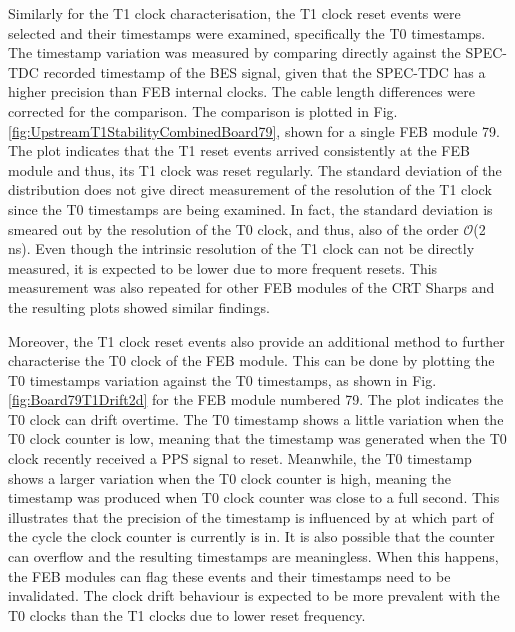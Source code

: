 Similarly for the T1 clock characterisation, the T1 clock reset events were selected and their timestamps were examined, specifically the T0 timestamps.
The timestamp variation was measured by comparing directly against the SPEC-TDC recorded timestamp of the BES signal, given that the SPEC-TDC has a higher precision than FEB internal clocks.
The cable length differences were corrected for the comparison.
The comparison is plotted in Fig. \ref{fig:UpstreamT1StabilityCombinedBoard79}, shown for a single FEB module 79.
The plot indicates that the T1 reset events arrived consistently at the FEB module and thus, its T1 clock was reset regularly.
The standard deviation of the distribution does not give direct measurement of the resolution of the T1 clock since the T0 timestamps are being examined. 
In fact, the standard deviation is smeared out by the resolution of the T0 clock, and thus, also of the order $\mathcal{O}$(2 ns).
Even though the intrinsic resolution of the T1 clock can not be directly measured, it is expected to be lower due to more frequent resets.
This measurement was also repeated for other FEB modules of the CRT Sharps and the resulting plots showed similar findings.

Moreover, the T1 clock reset events also provide an additional method to further characterise the T0 clock of the FEB module. 
This can be done by plotting the T0 timestamps variation against the T0 timestamps, as shown in Fig. \ref{fig:Board79T1Drift2d} for the FEB module numbered 79.
The plot indicates the T0 clock can drift overtime.
The T0 timestamp shows a little variation when the T0 clock counter is low, meaning that the timestamp was generated when the T0 clock recently received a PPS signal to reset.
Meanwhile, the T0 timestamp shows a larger variation when the T0 clock counter is high, meaning the timestamp was produced when T0 clock counter was close to a full second.
This illustrates that the precision of the timestamp is influenced by at which part of the cycle the clock counter is currently is in.
It is also possible that the counter can overflow and the resulting timestamps are meaningless.
When this happens, the FEB modules can flag these events and their timestamps need to be invalidated.
The clock drift behaviour is expected to be more prevalent with the T0 clocks than the T1 clocks due to lower reset frequency.

